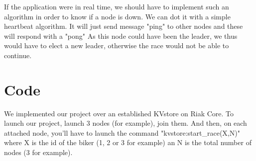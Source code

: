 \documentclass[a4paper, 11pt]{article}
\begin{document}
If the application were in real time, we should have to implement such an algorithm in order to know if a node is down. We can dot it with a simple heartbeat algorithm. It will just send message "ping" to other nodes and these will respond with a "pong" As this node could have been the leader, we thus would have to elect a new leader, otherwise the race would not be able to continue.

\section{Code}

We implemented our project over an established KVstore on Riak Core. To launch our project, launch 3 nodes (for example), join them. And then, on each attached node, you'll have to launch the command "kvstore:start\_race(X,N)" where X is the id of the biker (1, 2 or 3 for example) an N is the total number of nodes (3 for example).
\end{document}
